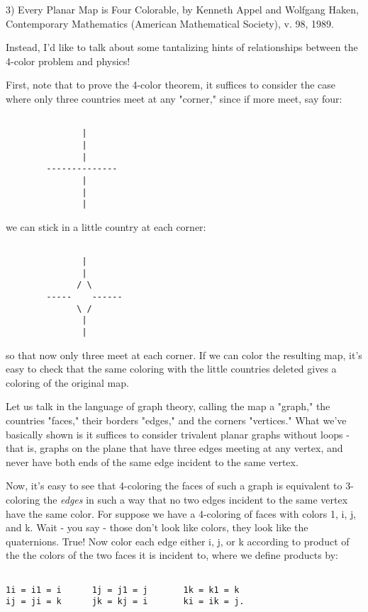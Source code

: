 3)  Every Planar Map is Four Colorable, by Kenneth Appel and Wolfgang
Haken, Contemporary Mathematics (American Mathematical Society), v. 98,
1989.  

Instead, I'd like to talk about some tantalizing hints of relationships
between the 4-color problem and physics!  

First, note that to prove the 4-color theorem, it suffices to consider
the case where only three countries meet at any "corner," since if more
meet, say four:


\begin{verbatim}

               |
               |
               |
        --------------
               |
               |
               |
\end{verbatim}
    

we can stick in a little country at each corner:



\begin{verbatim}

               |
               |
              / \
        -----    ------
              \ /
               |
               |
\end{verbatim}
    

so that now only three meet at each corner.  If we can color the
resulting map, it's easy to check that the same coloring with the little
countries deleted gives a coloring of the original map.

Let us talk in the language of graph theory, calling the map a "graph,"
the countries "faces," their borders "edges," and the corners
"vertices."  What we've basically shown is it suffices to consider
trivalent planar graphs without loops - that is, graphs on the plane
that have three edges meeting at any vertex, and never have both ends of
the same edge incident to the same vertex. 

Now, it's easy to see that 4-coloring the faces of such a graph is equivalent
to 3-coloring the \emph{edges} in such a way that no two edges incident to
the same vertex have the same color.   For suppose we have a 4-coloring
of faces with colors 1, i, j, and k.  Wait - you say - those don't look
like colors, they look like the quaternions.  True!   Now color each
edge either i, j, or k according to product of the the colors of the two
faces it is incident to, where we define products by:


\begin{verbatim}

1i = i1 = i      1j = j1 = j       1k = k1 = k
ij = ji = k      jk = kj = i       ki = ik = j.
\end{verbatim}
    

